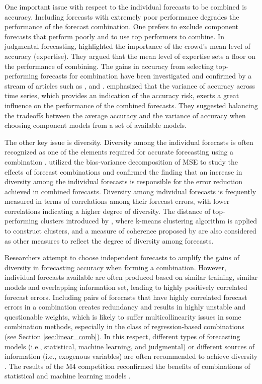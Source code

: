 \documentclass[11pt]{article}
\begin{document}
One important issue with respect to the individual forecasts to be combined is accuracy. Including forecasts with extremely poor performance degrades the performance of the forecast combination. One prefers to exclude component forecasts that perform poorly and to use top performers to combine. In judgmental forecasting, \citet{Mannes2014-dl} highlighted the importance of the crowd's mean level of accuracy (expertise). They argued that the mean level of expertise sets a floor on the performance of combining. The gains in accuracy from selecting top-performing forecasts for combination have been investigated and confirmed by a stream of articles such as \citet{Budescu2015-tu}, and \citet{Kourentzes2019-na}. \citet{Lichtendahl2020-ut} emphasized that the variance of accuracy across time series, which provides an indication of the accuracy risk, exerts a great influence on the performance of the combined forecasts. They suggested balancing the tradeoffs between the average accuracy and the variance of accuracy when choosing component models from a set of available models.

The other key issue is diversity. Diversity among the individual forecasts is often recognized as one of the elements required for accurate forecasting using a combination \citep{Batchelor1995-ps,Brown2005-aa,Thomson2019-al}. \citet{Atiya2020-ge} utilized the bias-variance decomposition of MSE to study the effects of forecast combinations and confirmed the finding that an increase in diversity among the individual forecasts is responsible for the error reduction achieved in combined forecasts. Diversity among individual forecasts is frequently measured in terms of correlations among their forecast errors, with lower correlations indicating a higher degree of diversity. The distance of top-performing clusters introduced by \citet{Lemke2010-wn}, where k-means clustering algorithm is applied to construct clusters, and a measure of coherence proposed by \citet{Thomson2019-al} are also considered as other measures to reflect the degree of diversity among forecasts.

Researchers attempt to choose independent forecasts to amplify the gains of diversity in forecasting accuracy when forming a combination. However, individual forecasts available are often produced based on similar training, similar models and overlapping information set, leading to highly positively correlated forecast errors. Including pairs of forecasts that have highly correlated forecast errors in a combination creates redundancy and results in highly unstable and questionable weights, which is likely to suffer multicollinearity issues in some combination methods, especially in the class of regression-based combinations (see Section \ref{sec:linear_comb}). In this respect, different types of forecasting models (i.e., statistical, machine learning, and judgmental) or different sources of information (i.e., exogenous variables) are often recommended to achieve diversity \citep{Atiya2020-ge}. The results of the M4 competition reconfirmed the benefits of combinations of statistical and machine learning models \citep{Makridakis2020-hu}.
\end{document}
